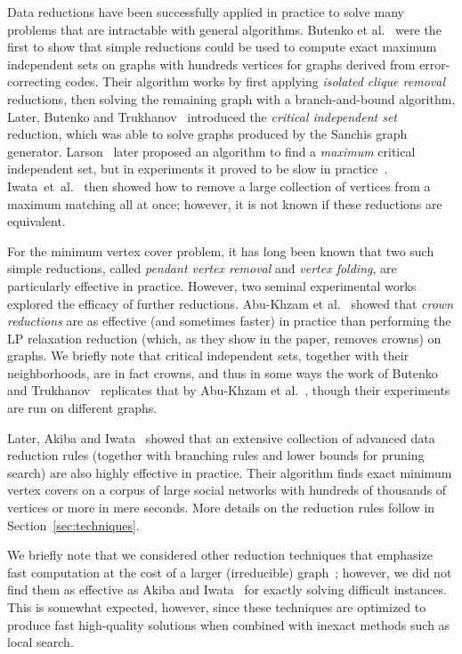 \documentclass[twoside,leqno,twocolumn]{article}
\newcommand{\etal}{et~al.\xspace}
\begin{document}
Data reductions have been successfully applied in practice to solve many problems that are intractable with general algorithms. Butenko et al.~\cite{butenko-2002,butenko-correcting-codes-2009} were the first to show that simple reductions could be used to compute exact maximum independent sets on graphs with hundreds vertices for graphs derived from error-correcting codes. Their algorithm works by first applying \emph{isolated clique removal} reductions, then solving the remaining graph with a branch-and-bound algorithm. Later, Butenko and Trukhanov~\cite{butenko-trukhanov} introduced the \emph{critical independent set} reduction, which was able to solve graphs produced by the Sanchis graph generator.
Larson~\cite{larson-2007} later proposed an algorithm to find a \emph{maximum} critical independent set, but in experiments it proved to be slow in practice~\cite{strash2016power}.
Iwata~\etal~\cite{iwata-2014} then showed how to remove a large collection of vertices from a maximum matching all at once; however, it is not known if these reductions are equivalent.

For the minimum vertex cover problem, it has long been known that two such simple reductions, called \emph{pendant vertex removal} and \emph{vertex folding}, are particularly effective in practice. However, two seminal experimental works explored the efficacy of further reductions. Abu-Khzam et al.~\cite{abu-khzam-2007} showed that \emph{crown reductions} are as effective (and sometimes faster) in practice than performing the LP relaxation reduction (which, as they show in the paper, removes crowns) on graphs. We briefly note that critical independent sets, together with their neighborhoods, are in fact crowns, and thus in some ways the work of Butenko and Trukhanov~\cite{butenko-trukhanov} replicates that by Abu-Khzam et al.~\cite{abu-khzam-2007}, though their experiments are run on different graphs.

Later, Akiba and Iwata~\cite{akiba-tcs-2016} showed that an extensive collection of advanced data reduction rules (together with branching rules and lower bounds for pruning search) are also highly effective in practice. Their algorithm finds exact minimum vertex covers on a corpus of large social networks with hundreds of thousands of vertices or more in mere seconds. More details on the reduction rules follow in Section~\ref{sec:techniques}.

We briefly note that we considered other reduction techniques that emphasize fast computation at the cost of a larger (irreducible) graph~\cite{chang2017computing,strash2016power,DBLP:conf/alenex/Hespe0S18}; however, we did not find them as effective as Akiba and Iwata~\cite{akiba-tcs-2016} for exactly solving difficult instances. This is somewhat expected, however, since these techniques are optimized to produce fast high-quality solutions when combined with inexact methods such as local search.
\end{document}
